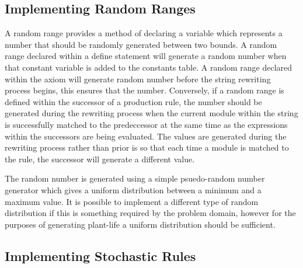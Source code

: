 \subsection{Implementing Random Ranges}

\begin{flushleft}

A random range provides a method of declaring a variable which represents a number that should be randomly generated between two bounds. A random range declared within a define statement will generate a random number when that constant variable is added to the constants table. A random range declared within the axiom will generate random number before the string rewriting process begins, this ensures that the number. Conversely, if a random range is defined within the successor of a production rule, the number should be generated during the rewriting process when the current module within the string is successfully matched to the predeccessor at the same time as the expressions within the successors are being evaluated. The values are generated during the rewriting process rather than prior is so that each time a module is matched to the rule, the successor will generate a different value. \\

\vspace{5mm}

The random number is generated using a simple psuedo-random number generator which gives a uniform distribution between a minimum and a maximum value. It is possible to implement a different type of random distribution if this is something required by the problem domain, however for the purposes of generating plant-life a uniform distribution should be sufficient.  

\end{flushleft}

\subsection{Implementing Stochastic Rules}

